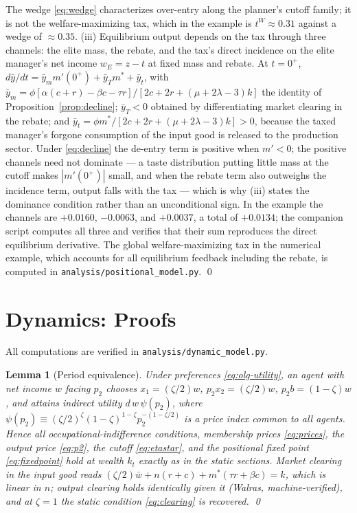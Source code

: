 \documentclass[12pt,letterpaper]{article}
\newtheorem{lemma}{Lemma}
\theoremstyle{definition}
\begin{document}
The wedge \eqref{eq:wedge} characterizes over-entry along the planner's cutoff family; it is not the welfare-maximizing tax, which in the example is $t^{W}\approx 0.31$ against a wedge of $\approx 0.35$.
(iii) Equilibrium output depends on the tax through three channels: the elite mass, the rebate, and the tax's direct incidence on the elite manager's net income $w_E = z - t$ at fixed mass and rebate.
At $t=0^{+}$, $d\bar{y}/dt = \bar{y}_m m'(0^{+}) + \bar{y}_T m^\ast + \bar{y}_t$, with $\bar{y}_m = \phi[\alpha(c+r)-\beta c-\tau r]/[2c+2r+(\mu+2\lambda-3)k]$ the identity of Proposition~\ref{prop:decline}; $\bar{y}_T<0$ obtained by differentiating market clearing in the rebate; and $\bar{y}_t = \phi m^\ast/[2c+2r+(\mu+2\lambda-3)k]>0$, because the taxed manager's forgone consumption of the input good is released to the production sector.
Under \eqref{eq:decline} the de-entry term is positive when $m'<0$; the positive channels need not dominate --- a taste distribution putting little mass at the cutoff makes $|m'(0^{+})|$ small, and when the rebate term also outweighs the incidence term, output falls with the tax --- which is why (iii) states the dominance condition rather than an unconditional sign.
In the example the channels are $+0.0160$, $-0.0063$, and $+0.0037$, a total of $+0.0134$; the companion script computes all three and verifies that their sum reproduces the direct equilibrium derivative.
The global welfare-maximizing tax in the numerical example, which accounts for all equilibrium feedback including the rebate, is computed in \texttt{analysis/positional\_model.py}.
\qed

\section{Dynamics: Proofs}\label{app:dynamics}

All computations are verified in \texttt{analysis/dynamic\_model.py}.

\begin{lemma}[Period equivalence]\label{lem:period} Under preferences \eqref{eq:olg-utility}, an agent with net income $w$ facing $p_2$ chooses $x_1=(\zeta/2)w$, $p_2x_2=(\zeta/2)w$, $p_2b=(1-\zeta)w$, and attains indirect utility $d\,w\,\psi(p_2)$, where $\psi(p_2)\equiv(\zeta/2)^{\zeta}(1-\zeta)^{1-\zeta}p_2^{-(1-\zeta/2)}$ is a price index common to all agents.
Hence all occupational-indifference conditions, membership prices \eqref{eq:prices}, the output price \eqref{eq:p2}, the cutoff \eqref{eq:etastar}, and the positional fixed point \eqref{eq:fixedpoint} hold at wealth $k_t$ exactly as in the static sections.
Market clearing in the input good reads $(\zeta/2)\bar{w} + n(r+c) + m^\ast(\tau r+\beta c) = k$, which is linear in $n$; output clearing holds identically given it (Walras, machine-verified), and at $\zeta=1$ the static condition \eqref{eq:clearing} is recovered.
\qed
\end{lemma}
\end{document}
